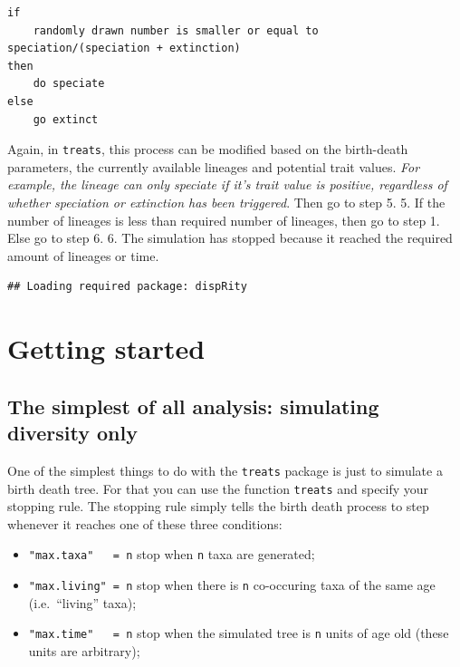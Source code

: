 \documentclass[
]{book}
\providecommand{\tightlist}{%
  \setlength{\itemsep}{0pt}\setlength{\parskip}{0pt}}
\begin{document}
\begin{verbatim}
if
    randomly drawn number is smaller or equal to speciation/(speciation + extinction)
then
    do speciate
else
    go extinct
\end{verbatim}

Again, in \texttt{treats}, this process can be modified based on the birth-death parameters, the currently available lineages and potential trait values. \emph{For example, the lineage can only speciate if it's trait value is positive, regardless of whether speciation or extinction has been triggered}.
Then go to step 5.
5. If the number of lineages is less than required number of lineages, then go to step 1. Else go to step 6.
6. The simulation has stopped because it reached the required amount of lineages or time.

\begin{verbatim}
## Loading required package: dispRity
\end{verbatim}

\hypertarget{gettingstarted}{%
\chapter{Getting started}\label{gettingstarted}}

\hypertarget{the-simplest-of-all-analysis-simulating-diversity-only}{%
\section{The simplest of all analysis: simulating diversity only}\label{the-simplest-of-all-analysis-simulating-diversity-only}}

One of the simplest things to do with the \texttt{treats} package is just to simulate a birth death tree.
For that you can use the function \texttt{treats} and specify your stopping rule.
The stopping rule simply tells the birth death process to step whenever it reaches one of these three conditions:

\begin{itemize}
\tightlist
\item
  \texttt{"max.taxa"\ \ \ =\ n} stop when \texttt{n} taxa are generated;
\item
  \texttt{"max.living"\ =\ n} stop when there is \texttt{n} co-occuring taxa of the same age (i.e.~``living'' taxa);
\item
  \texttt{"max.time"\ \ \ =\ n} stop when the simulated tree is \texttt{n} units of age old (these units are arbitrary);
\end{itemize}
\end{document}
